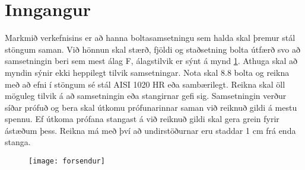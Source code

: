 \documentclass[12pt, draft, isbabel]{rureport}
\begin{document}
\maketitle

\tableofcontents

\listoffixmes

\clearpage

\section{Inngangur}\label{ch::inngangur}

Markmið verkefnisins er að hanna boltasamsetningu sem halda skal þremur stál stöngum saman. Við hönnun skal stærð, fjöldi og staðsetning bolta útfærð svo að samsetningin beri sem mest álag F, álagstilvik er sýnt á mynd \ref{fig::forsendur}. Athuga skal að myndin sýnir ekki heppilegt tilvik samsetningar. Nota skal 8.8 bolta og reikna með að efni í stöngum sé stál AISI 1020 HR eða sambærilegt. Reikna skal öll möguleg tilvik á að samsetningin eða stangirnar gefi sig. Samsetningin verður síðar prófuð og bera skal útkomu prófunarinnar saman við reiknuð gildi á mestu spennu. Ef útkoma prófana stangast á við reiknuð gildi skal gera grein fyrir ástæðum þess. Reikna má með því að undirstöðurnar eru staddar 1 cm frá enda stanga.

\begin{figure}
	\centering
	\texttt{[image: forsendur]}
	\caption{}
	\label{fig::forsendur}
\end{figure}




\printbibliography
\end{document}
